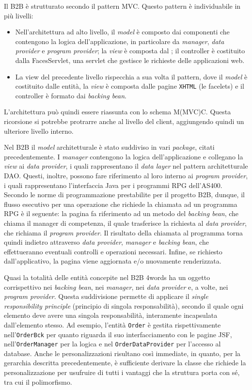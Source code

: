 Il B2B è strutturato secondo il pattern \Gls{MVC}. Questo pattern è individuabile in più livelli:
\begin{itemize}
	\item Nell'architettura ad alto livello, il \textit{model} è composto dai componenti che contengono la logica dell'applicazione, in particolare da \textit{manager}, \textit{data provider} e \textit{program provider}; la \textit{view} è composta dal ; il controller è costituito dalla FacesServlet, una \gls{servlet} che gestisce le richieste delle applicazioni web.
	\item La view del precedente livello rispecchia a sua volta il pattern, dove il \textit{model} è costituito dalle entità, la \textit{view} è composta dalle pagine \texttt{\gls{XHTML}} (le \gls{facelets}) e il controller è formato dai \textit{backing bean}.
\end{itemize}
L'architettura può quindi essere riassunta con lo schema M(MVC)C. Questa ricorsione si potrebbe protrarre anche al livello del client, aggiungendo quindi un ulteriore livello interno.

Nel B2B il \textit{model} architetturale è stato suddiviso in vari \textit{package}, citati precedentemente. I \textit{manager} contengono la logica dell'applicazione e collegano la \textit{view} ai \textit{data provider}, i quali rappresentano il \textit{data layer} nel pattern architetturale \Gls{DAO}. Questi, inoltre, possono fare riferimento al loro interno ai \textit{program provider}, i quali rappresentano l'interfaccia Java per i programmi \Gls{RPG} dell'\Gls{AS400}. Secondo le norme di programmazione prestabilite per il progetto B2B, dunque, il flusso esecutivo per una operazione che richiede la chiamata ad un programma RPG è il seguente: la pagina fa riferimento ad un metodo del \textit{backing bean}, che chiama il manager di competenza, il quale trasferisce la richiesta al \textit{data provider}, che richiama il \textit{program provider}. Il risultato della chiamata al programma torna quindi indietro attraverso \textit{data provider}, \textit{manager} e \textit{backing bean}, che effettueranno eventuali controlli e operazioni necessari. Infine, se richiesto dall'applicativo, la pagina viene aggiornata e/o nuovamente renderizzata.

Quasi la totalità delle entità concepite nel B2B 4words ha un oggetto corrispettivo nei \textit{backing bean}, nei \textit{manager}, nei \textit{data provider} e, a volte, nei \textit{program provider}. Questa suddivisione permette di applicare il \textit{single responsibility principle} (principio di singola responsabilità), secondo il quale ogni elemento deve avere una singola responsabilità, interamente incapsulata dall'elemento stesso. Ad esempio, l'entità \texttt{Order} è gestita rispettivamente nell'\texttt{OrderBck} per quanto riguarda il suo interfacciamento con le pagine JSF, nell'\texttt{OrderManager} per la logica e nel \texttt{OrderDataProvider} per l'accesso al database. Anche le personalizzazioni risultano così immediate, in quanto, per la gerarchia descritta precedentemente, è sufficiente derivare la classe che richiede la personalizzazione per usufruire di tutti i vantaggi che la struttura porta con sé, tra cui il polimorfismo.

